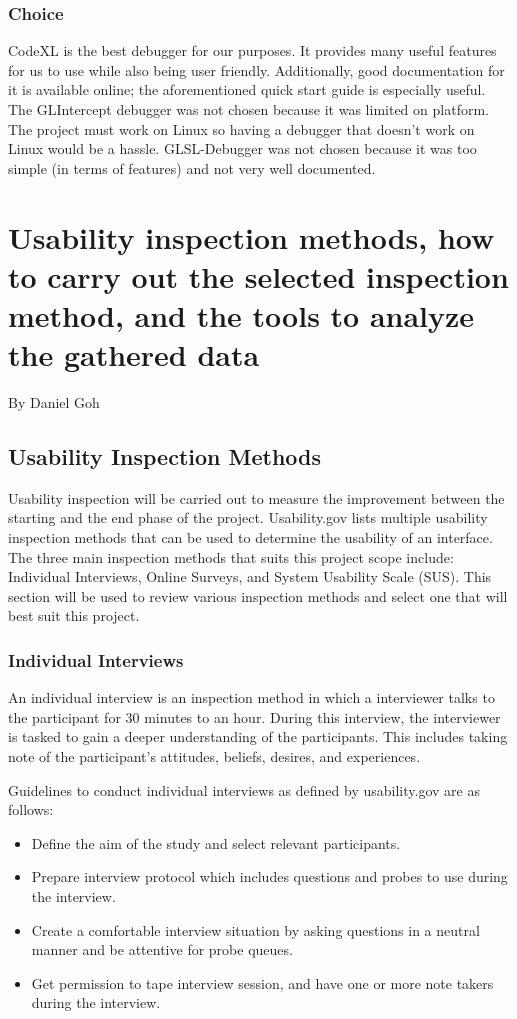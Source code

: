 \documentclass[10pt,journal,compsoc,draftclsnofoot]{IEEEtran}
\begin{document}
\subsubsection{Choice}
CodeXL is the best debugger for our purposes.
It provides many useful features for us to use while also being user friendly. 
Additionally, good documentation for it is available online; the aforementioned quick start guide is especially useful.
The GLIntercept debugger was not chosen because it was limited on platform.
The project must work on Linux so having a debugger that doesn't work on Linux would be a hassle.
GLSL-Debugger was not chosen because it was too simple (in terms of features) and not very well documented.

\newpage

\section{Usability inspection methods, how to carry out the selected inspection method, and the tools to analyze the gathered data}
\large{By Daniel Goh}

\normalsize
\subsection{Usability Inspection Methods}
Usability inspection will be carried out to measure the improvement between the starting and the end phase of the project.
Usability.gov lists multiple usability inspection methods that can be used to determine the usability of an interface. \cite{userResearch}
The three main inspection methods that suits this project scope include: Individual Interviews, Online Surveys, and System Usability Scale (SUS).
This section will be used to review various inspection methods and select one that will best suit this project.

\subsubsection{Individual Interviews}
An individual interview is an inspection method in which a interviewer talks to the participant for 30 minutes to an hour.
During this interview, the interviewer is tasked to gain a deeper understanding of the participants.
This includes taking note of the participant's attitudes, beliefs, desires, and experiences.

Guidelines to conduct individual interviews as defined by usability.gov are as follows:
\begin{itemize}
\item Define the aim of the study and select relevant participants.
\item Prepare interview protocol which includes questions and probes to use during the interview.
\item Create a comfortable interview situation by asking questions in a neutral manner and be attentive for probe queues.
\item Get permission to tape interview session, and have one or more note takers during the interview.
\end{itemize}
\end{document}
